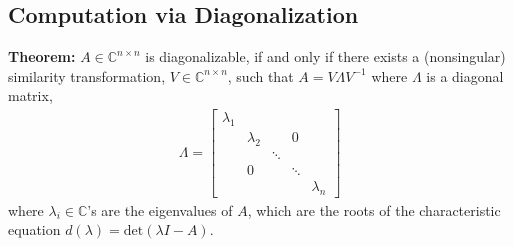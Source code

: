 \documentclass[twoside]{article}
\begin{document}
\subsection{Computation via Diagonalization}

\textbf{Theorem:} $A \in \mathbb{C}^{n \times n}$ is diagonalizable, if and only if there exists a (nonsingular) similarity transformation, 
$V \in \mathbb{C}^{n \times n}$, such that $A = V \Lambda V^{-1}$ where $\Lambda$ is a diagonal matrix, 
%
\begin{align*}
	\Lambda = \left[ \begin{array}{ccccc} \lambda_1 &  & & &  \\  & \lambda_2  &  & 0 &  \\ &  & \ddots & \\ & 0 & & \ddots & \\ & &  & &  \lambda_n \end{array} \right]
\end{align*}
%
where $\lambda_i \in \mathbb{C}$'s are the eigenvalues of $A$, which are the roots of the characteristic equation $d(\lambda) = \mathrm{det}(\lambda I - A)$.
\end{document}
